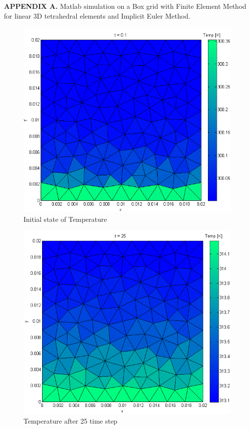 \documentclass[12pt]{article}
\begin{document}
	\textbf{APPENDIX A.} Matlab simulation on a Box grid with Finite Element Method for linear 3D tetrahedral elements and Implicit Euler Method.
	
	\begin{figure}[H]
    \includegraphics[scale=0.5]{matlab-results/1.png}
    \centering
    \caption{Initial state of Temperature}
	\end{figure}	
	\begin{figure}[H]
    \includegraphics[scale=0.5]{matlab-results/2.png}
    \centering
    \caption{Temperature after 25 time step}
	\end{figure}	
\end{document}
